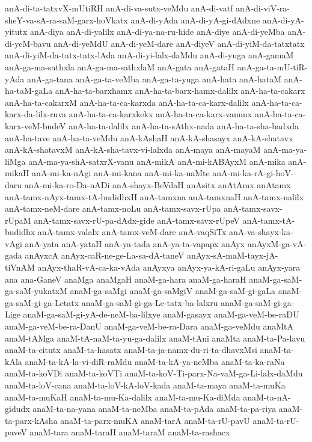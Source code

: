 {anA-di-ta-tatxvX-mUtiRH
anA-di-va-sutx-veMdu
anA-di-vatf
anA-di-viV-ra-sheY-va-sA-ra-saM-garx-hoVkatx
anA-di-yAda
anA-di-yA-gi-dAdxne
anA-di-yA-yitutx
anA-diya
anA-di-yalilx
anA-di-ya-na-ru-hide
anA-diye
anA-di-yeMba
anA-di-yeM-bavu
anA-di-yeMdU
anA-di-yeM-dare
anA-diyeV
anA-di-yiM-da-tatxtatx
anA-di-yiM-da-tatx-tatx-lAda
anA-di-yi-lalx-daMdu
anA-di-yuga
anA-gamaM
anA-ga-ma-sathxla
anA-ga-ma-sathxlaM
anA-gata
anA-gataH
anA-ga-ta-mU-tiR-yAda
anA-ga-tana
anA-ga-ta-veMba
anA-ga-ta-yuga
anA-hata
anA-hataM
anA-ha-taM-gaLa
anA-ha-ta-barxhamx
anA-ha-ta-barx-hamx-dalilx
anA-ha-ta-cakarx
anA-ha-ta-cakarxM
anA-ha-ta-ca-karxda
anA-ha-ta-ca-karx-dalilx
anA-ha-ta-ca-karx-da-lilx-ruva
anA-ha-ta-ca-karxkekx
anA-ha-ta-ca-karx-vanunx
anA-ha-ta-ca-karx-veM-budeV
anA-ha-ta-dalilx
anA-ha-ta-sAthx-nada
anA-ha-ta-sha-badxda
anA-ha-tave
anA-ha-ta-veMdu
anA-kAshaH
anA-kA-shasayx
anA-kA-shatavx
anA-kA-shatavxM
anA-kA-sha-tavx-vi-lalxda
anA-maya
anA-mayaM
anA-ma-ya-liMga
anA-ma-ya-shA-satxrX-vanu
anA-mikA
anA-mi-kABAyxM
anA-mika
anA-mikaH
anA-mi-ka-nAgi
anA-mi-kana
anA-mi-ka-naMte
anA-mi-ka-rA-gi-hoV-daru
anA-mi-ka-ro-Da-nADi
anA-shayx-BeVdaH
anAsitx
anAtAmx
anAtamx
anA-tamx-nAyx-tamx-tA-budidhxH
anA-tamxna
anA-tamxnaH
anA-tamx-nalilx
anA-tamx-neM-dare
anA-tamx-noLu
anA-tamx-savx-rUpa
anA-tamx-savx-rUpaM
anA-tamx-savx-rU-pa-dAdx-gide
anA-tamx-savx-rUpeV
anA-tamx-tA-budidhx
anA-tamx-valalx
anA-tamx-veM-dare
anA-vaqSiTx
anA-va-shayx-ka-vAgi
anA-yata
anA-yataH
anA-ya-tada
anA-ya-ta-vapapx
anAyx
anAyxM-ga-vA-gada
anAyxcA
anAyx-caR-ne-ge-La-sa-dA-taneV
anAyx-sA-maM-tayx-jA-tiVnAM
anAyx-thaR-vA-ca-ka-vAda
anAyxya
anAyx-ya-kA-ri-gaLu
anAyx-yara
ana
ana-GaneV
anaMga
anaMgaH
anaM-ga-hara
anaM-ga-haraH
anaM-ga-saM-ga-saM-yukatxM
anaM-ga-saMgi
anaM-ga-saMgiV
anaM-ga-saM-gi-gaLa
anaM-ga-saM-gi-ga-Letatx
anaM-ga-saM-gi-ga-Le-tatx-ba-lalxru
anaM-ga-saM-gi-ga-Lige
anaM-ga-saM-gi-yA-de-neM-ba-lilxye
anaM-gasayx
anaM-ga-veM-be-raDU
anaM-ga-veM-be-ra-DanU
anaM-ga-veM-be-ra-Dara
anaM-ga-veMdu
anaMtA
anaM-tAMga
anaM-tA-naM-ta-yu-ga-dalilx
anaM-tAni
anaMta
anaM-ta-Pa-lavu
anaM-ta-citutx
anaM-ta-hasatx
anaM-ta-ja-namx-du-ri-ta-dhavxMsi
anaM-ta-kAla
anaM-ta-kA-la-vi-diR-raMdu
anaM-ta-kA-ya-neMba
anaM-ta-ka-raNa
anaM-ta-koVDi
anaM-ta-koVTi
anaM-ta-koV-Ti-parx-Na-vaM-ga-Li-lalx-daMdu
anaM-ta-loV-cana
anaM-ta-loV-kA-loV-kada
anaM-ta-maya
anaM-ta-muKa
anaM-ta-muKaH
anaM-ta-mu-Ka-dalilx
anaM-ta-mu-Ka-diMda
anaM-ta-nA-gidudx
anaM-ta-na-yana
anaM-ta-neMba
anaM-ta-pAda
anaM-ta-pa-riya
anaM-ta-parx-kAsha
anaM-ta-parx-muKA
anaM-tarA
anaM-ta-rU-pavU
anaM-ta-rU-paveV
anaM-tara
anaM-taraH
anaM-taraM
anaM-ta-rashacx
}
